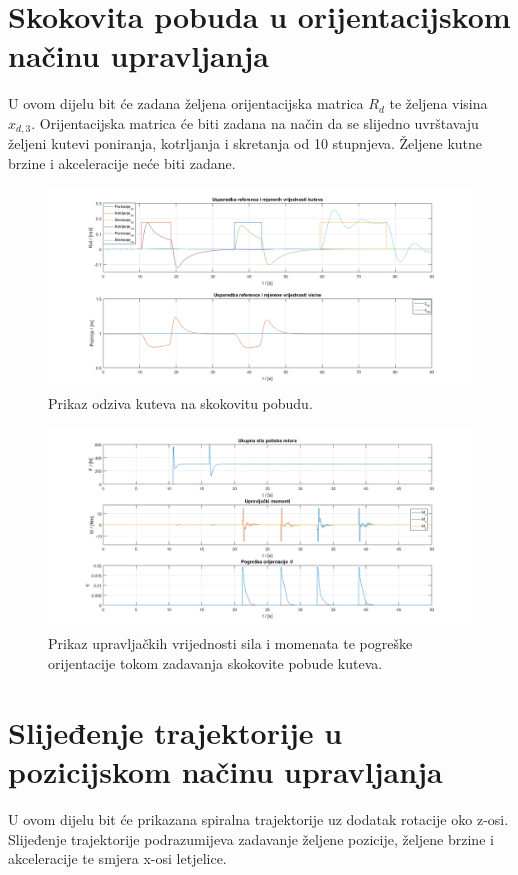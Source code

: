 \documentclass[times, utf8, diplomski]{fer}
\begin{document}
	\section{Skokovita pobuda u orijentacijskom načinu upravljanja}
	U ovom dijelu bit će zadana željena orijentacijska matrica $R_d$ te željena visina $x_{d,3}$. Orijentacijska matrica će biti zadana na način da se slijedno uvrštavaju željeni kutevi poniranja, kotrljanja i skretanja od 10 stupnjeva. Željene kutne brzine i akceleracije neće biti zadane. 
	\begin{figure}[h!]
		\includegraphics[width=\textwidth]{plots/orientation_euler.png}
		\caption{Prikaz odziva kuteva na skokovitu pobudu.}
	\end{figure}
	
	\newpage
	\clearpage
	
	\begin{figure}[h!]
		\includegraphics[width=\textwidth]{plots/pos_force_moments.png}
		\caption{Prikaz upravljačkih vrijednosti sila i momenata te pogreške orijentacije tokom zadavanja skokovite pobude kuteva.}
	\end{figure}
	
	\section{Slijeđenje trajektorije u pozicijskom načinu upravljanja}
	U ovom dijelu bit će prikazana spiralna trajektorije uz dodatak rotacije oko z-osi. Slijeđenje trajektorije podrazumijeva zadavanje željene pozicije, željene brzine i akceleracije te smjera x-osi letjelice.
	
\end{document}
